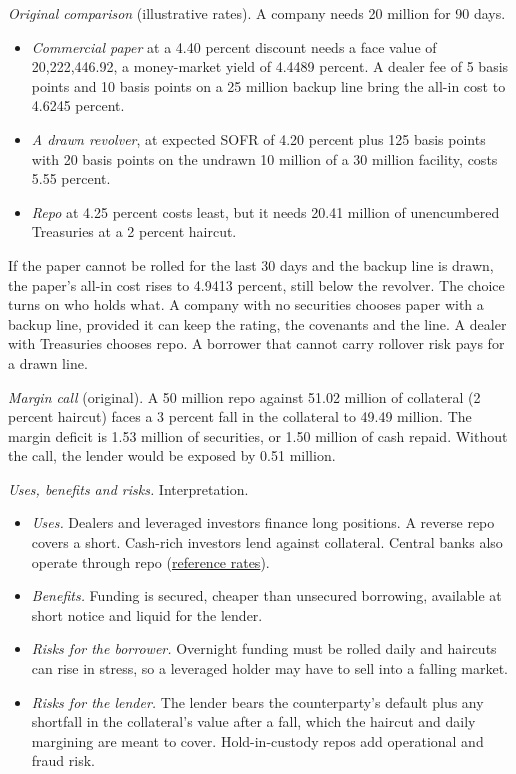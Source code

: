 \begin{qfdefinition}
\emph{Original comparison} (illustrative rates). A company needs 20 million for 90 days.
\begin{itemize}
\item \emph{Commercial paper} at a 4.40 percent discount needs a face value of 20{,}222{,}446.92, a money-market yield of 4.4489 percent. A dealer fee of 5 basis points and 10 basis points on a 25 million backup line bring the all-in cost to 4.6245 percent.
\item \emph{A drawn revolver}, at expected SOFR of 4.20 percent plus 125 basis points with 20 basis points on the undrawn 10 million of a 30 million facility, costs 5.55 percent.
\item \emph{Repo} at 4.25 percent costs least, but it needs 20.41 million of unencumbered Treasuries at a 2 percent haircut.
\end{itemize}
If the paper cannot be rolled for the last 30 days and the backup line is drawn, the paper's all-in cost rises to 4.9413 percent, still below the revolver. The choice turns on who holds what. A company with no securities chooses paper with a backup line, provided it can keep the rating, the covenants and the line. A dealer with Treasuries chooses repo. A borrower that cannot carry rollover risk pays for a drawn line.

\emph{Margin call} (original). A 50 million repo against 51.02 million of collateral (2 percent haircut) faces a 3 percent fall in the collateral to 49.49 million. The margin deficit is 1.53 million of securities, or 1.50 million of cash repaid. Without the call, the lender would be exposed by 0.51 million.

\emph{Uses, benefits and risks.} Interpretation.
\begin{itemize}
\item \emph{Uses.} Dealers and leveraged investors finance long positions. A reverse repo covers a short. Cash-rich investors lend against collateral. Central banks also operate through repo (\hyperref[def:money-market-reference-rates]{reference rates}).
\item \emph{Benefits.} Funding is secured, cheaper than unsecured borrowing, available at short notice and liquid for the lender.
\item \emph{Risks for the borrower.} Overnight funding must be rolled daily and haircuts can rise in stress, so a leveraged holder may have to sell into a falling market.
\item \emph{Risks for the lender.} The lender bears the counterparty's default plus any shortfall in the collateral's value after a fall, which the haircut and daily margining are meant to cover. Hold-in-custody repos add operational and fraud risk.
\end{itemize}


\end{qfdefinition}

